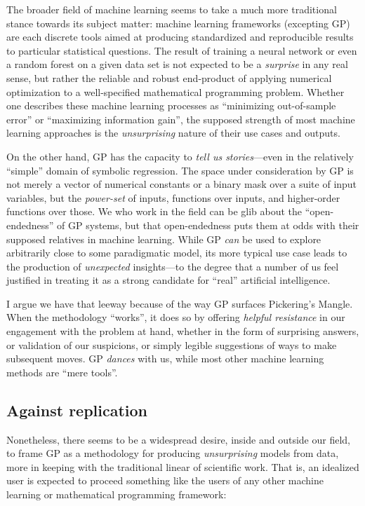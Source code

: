 The broader field of machine learning seems to take a much more traditional stance towards its subject matter: machine learning frameworks (excepting GP) are each discrete tools aimed at producing standardized and reproducible results to particular statistical questions. The result of training a neural network or even a random forest on a given data set is not expected to be a \emph{surprise} in any real sense, but rather the reliable and robust end-product of applying numerical optimization to a well-specified mathematical programming problem. Whether one describes these machine learning processes as ``minimizing out-of-sample error'' or ``maximizing information gain'', the supposed strength of most machine learning approaches is the \emph{unsurprising} nature of their use cases and outputs.

On the other hand, GP has the capacity to \emph{tell us stories}---even in the relatively ``simple'' domain of symbolic regression. The space under consideration by GP is not merely a vector of numerical constants or a binary mask over a suite of input variables, but the \emph{power-set} of inputs, functions over inputs, and higher-order functions over those. We who work in the field can be glib about the ``open-endedness'' of GP systems, but that open-endedness puts them at odds with their supposed relatives in machine learning. While GP \emph{can} be used to explore arbitrarily close to some paradigmatic model, its more typical use case leads to the production of \emph{unexpected} insights---to the degree that a number of us feel justified in treating it as a strong candidate for ``real'' artificial intelligence.

I argue we have that leeway because of the way GP surfaces Pickering's Mangle. When the methodology ``works'', it does so by offering \emph{helpful resistance} in our engagement with the problem at hand, whether in the form of surprising answers, or validation of our suspicions, or simply legible suggestions of ways to make subsequent moves. GP \emph{dances} with us, while most other machine learning methods are ``mere tools''.

\subsection{Against replication}\hypertarget{against-replication}{}\label{against-replication}

Nonetheless, there seems to be a widespread desire, inside and outside our field, to frame GP as a methodology for producing \emph{unsurprising} models from data, more in keeping with the traditional linear of scientific work. That is, an idealized user is expected to proceed something like the users of any other machine learning or mathematical programming framework:

